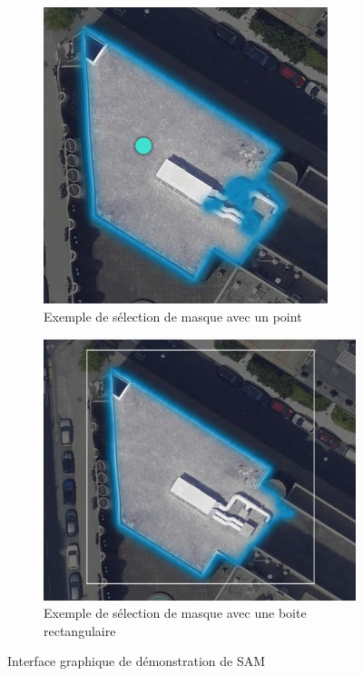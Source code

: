 \begin{figure}[H]
    \centering
    \begin{subfigure}[b]{0.35\textwidth}
        \centering
        \includegraphics[width=\textwidth]{02-main/figures/ch2/ch2_sam2_03_prompt1.png}
        \caption{Exemple de sélection de masque avec un point}
        \label{fig:ch2_sam2_03_prompt1}
    \end{subfigure}
    \hfill
    \begin{subfigure}[b]{0.435\textwidth}
        \centering
        \includegraphics[width=\textwidth]{02-main/figures/ch2/ch2_sam2_04_prompt2.png}
        \caption{Exemple de sélection de masque avec une boite rectangulaire}
        \label{fig:ch2_sam2_04_prompt2}
    \end{subfigure}
    \caption{Interface graphique de démonstration de SAM \cite{fair_segment_nodate}}
    \label{fig:ch2_sam2_prompt_exemple_point_rectangle}
\end{figure}


